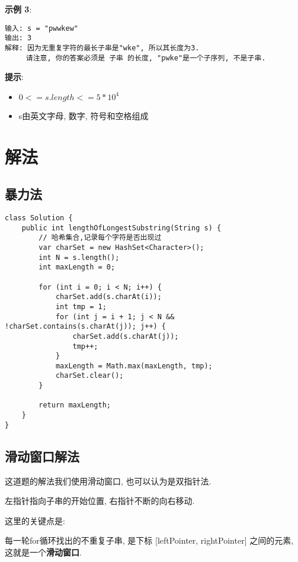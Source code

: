 \documentclass[oneside]{ctexbook}
\begin{document}
\textbf{示例 3}:

\begin{verbatim}
输入: s = "pwwkew"
输出: 3
解释: 因为无重复字符的最长子串是"wke", 所以其长度为3.
     请注意, 你的答案必须是 子串 的长度, "pwke"是一个子序列, 不是子串.
\end{verbatim}

\textbf{提示}:

\begin{itemize}
    \item $0 <= s.length <= 5 * 10^4$
    \item s由英文字母, 数字, 符号和空格组成
\end{itemize}

\section{解法}

\subsection{暴力法}

\begin{verbatim}
class Solution {
    public int lengthOfLongestSubstring(String s) {
        // 哈希集合,记录每个字符是否出现过
        var charSet = new HashSet<Character>();
        int N = s.length();
        int maxLength = 0;

        for (int i = 0; i < N; i++) {
            charSet.add(s.charAt(i));
            int tmp = 1;
            for (int j = i + 1; j < N && !charSet.contains(s.charAt(j)); j++) {
                charSet.add(s.charAt(j));
                tmp++;
            }
            maxLength = Math.max(maxLength, tmp);
            charSet.clear();
        }

        return maxLength;
    }
}
\end{verbatim}

\subsection{滑动窗口解法}

这道题的解法我们使用滑动窗口, 也可以认为是双指针法.

左指针指向子串的开始位置, 右指针不断的向右移动.

这里的关键点是:

每一轮for循环找出的不重复子串, 是下标 [leftPointer, rightPointer] 之间的元素, 这就是一个\textbf{滑动窗口}.
\end{document}
